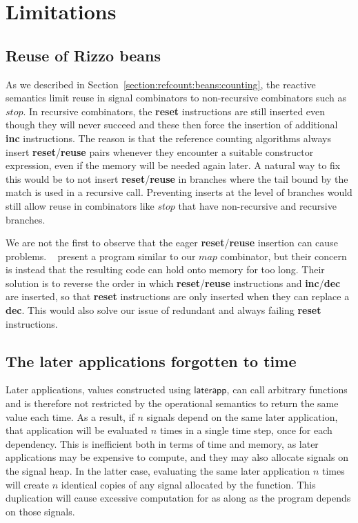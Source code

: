 \section{Limitations}\label{sec:limitations}

\subsection{Reuse of Rizzo beans}

As we described in Section~\ref{section:refcount:beans:counting}, the reactive semantics limit reuse in signal combinators to non-recursive combinators such as $stop$. In recursive combinators, the \textbf{reset} instructions are still inserted even though they will never succeed and these then force the insertion of additional \textbf{inc} instructions. 
The reason is that the reference counting algorithms always insert \textbf{reset}/\textbf{reuse} pairs whenever they encounter a suitable constructor expression, even if the memory will be needed again later.
A natural way to fix this would be to not insert \textbf{reset}/\textbf{reuse} in branches where the tail bound by the match is used in a recursive call. Preventing inserts at the level of branches would still allow reuse in combinators like $stop$ that have non-recursive and recursive branches. 

We are not the first to observe that the eager \textbf{reset}/\textbf{reuse} insertion can cause problems. 
\citeauthor*{frame_limited_reuse}~\cite{frame_limited_reuse} 
present a program similar to our $map$ combinator, but their concern is instead that the resulting code can hold onto memory for too long.
Their solution is to reverse the order in which \textbf{reset}/\textbf{reuse} instructions and \textbf{inc}/\textbf{dec} are inserted, so that \textbf{reset} instructions are only inserted when they can replace a \textbf{dec}.
This would also solve our issue of redundant and always failing \textbf{reset} instructions. 

\subsection{The later applications forgotten to time}\label{sec:later_applications_forget}

Later applications, values constructed using $\mathsf{laterapp}$, can call arbitrary functions and is therefore not restricted by the operational semantics to return the same value each time. As a result, if $n$ signals depend on the same later application, that application will be evaluated $n$ times in a single time step, once for each dependency. This is inefficient both in terms of time and memory, as later applications may be expensive to compute, and they may also allocate signals on the signal heap. In the latter case, evaluating the same later application $n$ times will create $n$ identical copies of any signal allocated by the function. This duplication will cause excessive computation for as along as the program depends on those signals.

